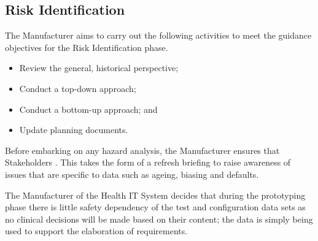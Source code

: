 \subsection{Risk Identification}
\begin{minipage}[t]{0.73\textwidth}
  The Manufacturer aims to carry out the following activities to meet the guidance objectives for the Risk Identification phase.
  \begin{itemize}
    \item Review the general, historical perspective;
    \item Conduct a top-down approach;
    \item Conduct a bottom-up approach; and
    \item Update planning documents.
  \end{itemize}
\end{minipage}
\begin{minipage}[t]{0.25\textwidth}
  \centering{}
\end{minipage}

Before embarking on any hazard analysis, the Manufacturer ensures that Stakeholders . This takes the form of a refresh briefing to raise awareness of issues that are specific to data such as ageing, biasing and defaults.

The Manufacturer of the Health IT System decides that during the prototyping phase there is little safety dependency of the test and \gls{configuration data} sets as no clinical decisions will be made based on their content; the data is simply being used to support the elaboration of requirements.

